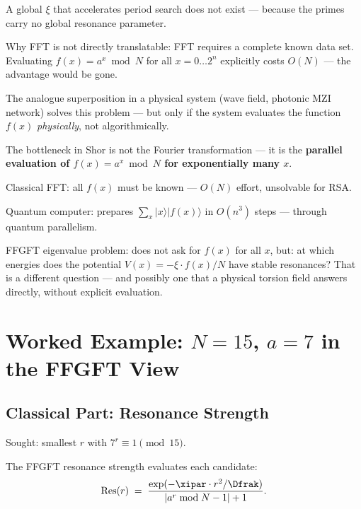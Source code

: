 A global $\xi$ that accelerates period search
does not exist --- because the primes carry no
global resonance parameter.

Why FFT is not directly translatable:
FFT requires a complete known data set.
Evaluating $f(x) = a^x \bmod N$ for all $x = 0 \ldots 2^n$
explicitly costs $O(N)$ --- the advantage would be gone.

The analogue superposition in a physical system
(wave field, photonic MZI network) solves this problem ---
but only if the system evaluates the function $f(x)$
\emph{physically}, not algorithmically.

\begin{important}
The bottleneck in Shor is not the
Fourier transformation --- it is the
\textbf{parallel evaluation of $f(x) = a^x \bmod N$
for exponentially many $x$}.

Classical FFT: all $f(x)$ must be known ---
$O(N)$ effort, unsolvable for RSA.

Quantum computer: prepares $\sum_x |x\rangle|f(x)\rangle$
in $O(n^3)$ steps --- through quantum parallelism.

FFGFT eigenvalue problem: does not ask for $f(x)$ for all $x$,
but: at which energies does the potential
$V(x) = -\xi \cdot f(x)/N$ have stable resonances?
That is a different question --- and possibly
one that a physical torsion field
answers directly, without explicit evaluation.
\end{important}

\section{Worked Example: \texorpdfstring{$N=15$, $a=7$}{N=15, a=7} in the FFGFT View}
\label{sec:example-n15}

\subsection{Classical Part: Resonance Strength}

Sought: smallest $r$ with $7^r \equiv 1 \pmod{15}$.

The FFGFT resonance strength evaluates each candidate:
\begin{equation}
  \text{Res}(r) \;=\;
  \frac{\exp(-\xipar \cdot r^2 / \Dfrak)}
       {|a^r \bmod N - 1| + 1}.
\end{equation}

